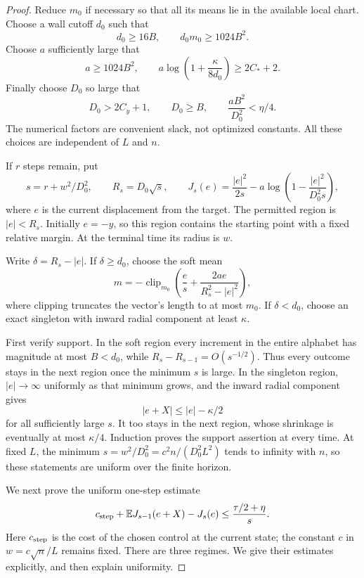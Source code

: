 \begin{proof}
Reduce \(m_0\) if necessary so that all its means lie in the available
local chart.  Choose a wall cutoff \(d_0\) such that
\[
 d_0\geq16B,
 \qquad d_0m_0\geq1024B^2.
\]
Choose \(a\) sufficiently large that
\[
 a\geq1024B^2,
 \qquad
 a\log\left(1+\frac{\kappa}{8d_0}\right)\geq2C_*+2.
\]
Finally choose \(D_0\) so large that
\begin{equation}\label{ap:constants}
 D_0>2C_y+1,
 \qquad D_0\geq B,
 \qquad \frac{aB^2}{D_0^2}<\eta/4.
\end{equation}
The numerical factors are convenient slack, not optimized constants.
All these choices are independent of \(L\) and \(n\).

If \(r\) steps remain, put
\[
 s=r+w^2/D_0^2,
 \qquad R_s=D_0\sqrt s,
 \qquad
 J_s(e)=\frac{|e|^2}{2s}
       -a\log\left(1-\frac{|e|^2}{D_0^2s}\right),
\]
where \(e\) is the current displacement from the target.  The permitted
region is \(|e|<R_s\).  Initially \(e=-y\), so this region contains
the starting point with a fixed relative margin.  At the terminal time
its radius is \(w\).

Write \(\delta=R_s-|e|\).  If \(\delta\geq d_0\), choose the soft
mean
\begin{equation}\label{ap:feedback}
 m=-\operatorname{clip}_{m_0}
   \left(\frac e s+\frac{2ae}{R_s^2-|e|^2}\right),
\end{equation}
where clipping truncates the vector's length to at most \(m_0\).
If \(\delta<d_0\), choose an exact singleton with inward radial
component at least \(\kappa\).

First verify support.  In the soft region every increment in the entire
alphabet has magnitude at most \(B<d_0\), while
\(R_s-R_{s-1}=O(s^{-1/2})\).  Thus every outcome stays in the next
region once the minimum \(s\) is large.  In the singleton region,
\(|e|\to\infty\) uniformly as that minimum grows, and the inward
radial component gives
\[
 |e+X|\leq |e|-\kappa/2
\]
for all sufficiently large \(s\).  It too stays in the next region,
whose shrinkage is eventually at most \(\kappa/4\).  Induction proves
the support assertion at every time.  At fixed \(L\), the minimum
\(s=w^2/D_0^2=c^2n/(D_0^2L^2)\) tends to infinity with \(n\), so
these statements are uniform over the finite horizon.

We next prove the uniform one-step estimate
\begin{equation}\label{ap:one-step}
 c_{\rm step}+\mathbb E J_{s-1}(e+X)-J_s(e)
 \leq\frac{\tau/2+\eta}{s}.
\end{equation}
Here \(c_{\rm step}\) is the cost of the chosen control at the
current state; the constant \(c\) in \(w=c\sqrt n/L\) remains fixed.
There are three regimes.  We give their estimates explicitly, and then
explain uniformity.


\end{proof}
